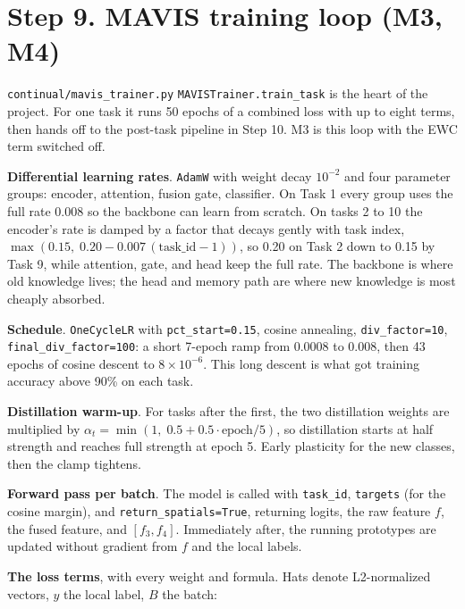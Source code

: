 \documentclass[11pt,a4paper]{article}
\newcommand{\code}[1]{\texttt{#1}}
\begin{document}
\section{Step 9. MAVIS training loop (M3, M4)}

\code{continual/mavis\_trainer.py} \code{MAVISTrainer.train\_task} is the heart of the project. For one task it runs 50 epochs of a combined loss with up to eight terms, then hands off to the post-task pipeline in Step 10. M3 is this loop with the EWC term switched off.

\textbf{Differential learning rates}. \code{AdamW} with weight decay $10^{-2}$ and four parameter groups: encoder, attention, fusion gate, classifier. On Task 1 every group uses the full rate 0.008 so the backbone can learn from scratch. On tasks 2 to 10 the encoder's rate is damped by a factor that decays gently with task index, $\max(0.15,\; 0.20 - 0.007\,(\mathrm{task\_id} - 1))$, so 0.20 on Task 2 down to 0.15 by Task 9, while attention, gate, and head keep the full rate. The backbone is where old knowledge lives; the head and memory path are where new knowledge is most cheaply absorbed.

\textbf{Schedule}. \code{OneCycleLR} with \code{pct\_start=0.15}, cosine annealing, \code{div\_factor=10}, \code{final\_div\_factor=100}: a short 7-epoch ramp from 0.0008 to 0.008, then 43 epochs of cosine descent to $8 \times 10^{-6}$. This long descent is what got training accuracy above 90\% on each task.

\textbf{Distillation warm-up}. For tasks after the first, the two distillation weights are multiplied by $\alpha_t = \min(1,\; 0.5 + 0.5 \cdot \mathrm{epoch} / 5)$, so distillation starts at half strength and reaches full strength at epoch 5. Early plasticity for the new classes, then the clamp tightens.

\textbf{Forward pass per batch}. The model is called with \code{task\_id}, \code{targets} (for the cosine margin), and \code{return\_spatials=True}, returning logits, the raw feature $f$, the fused feature, and $[f_3, f_4]$. Immediately after, the running prototypes are updated without gradient from $f$ and the local labels.

\textbf{The loss terms}, with every weight and formula. Hats denote L2-normalized vectors, $y$ the local label, $B$ the batch:
\end{document}
